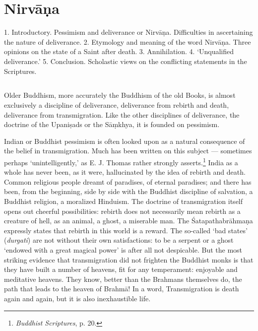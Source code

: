 \documentclass[a4paper, 11pt, oneside, english, landscape]{article}
\begin{document}
\section{Nirvāṇa}
\begin{center}\footnotesize
1. Introductory. Pessimism and deliverance or Nirvāṇa. Difficulties in ascertaining the nature of deliverance. 2. Etymology and meaning of the word Nirvāṇa. Three opinions on the state of a Saint after death. 3. Annihilation. 4. `Unqualified deliverance.' 5. Conclusion. Scholastic views on the conflicting statements in the Scriptures.
\end{center}
\subsection{}
\paragraph{}
Older Buddhism, more accurately the Buddhism of the old Books, is almost exclusively a discipline of deliverance, deliverance from rebirth and death, deliverance from transmigration. Like the other disciplines of deliverance, the doctrine of the Upaniṣads or the Sāṃkhya, it is founded on pessimism.

Indian or Buddhist pessimism is often looked upon as a natural consequence of the belief in transmigration. Much has been written on this subject --- sometimes perhaps `unintelligently,' as E. J. Thomas rather strongly asserts.\footnote{\emph{Buddhist Scriptures}, p. 20.} India as a whole has never been, as it were, hallucinated by the idea of rebirth and death. Common religious people dreamt of paradises, of eternal paradises; and there has been, from the beginning, side by side with the Buddhist discipline of salvation, a Buddhist religion, a moralized Hinduism. The doctrine of transmigration itself opens out cheerful possibilities: rebirth does not necessarily mean rebirth as a creature of hell, as an animal, a ghost, a miserable man. The Śatapathabrāhmaṇa expressly states that rebirth in this world is a reward. The so-called `bad states' (\emph{durgati}) are not without their own satisfactions: to be a serpent or a ghost `endowed with a great magical power' is after all not despicable. But the most striking evidence that transmigration did not frighten the Buddhist monks is that they have built a number of heavens, fit for any temperament: enjoyable and meditative heavens. They know, better than the Brahmans themselves do, the path that leads to the heaven of Brahmā! In a word, Transmigration is death again and again, but it is also inexhaustible life.
\end{document}

